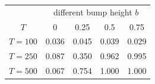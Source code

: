 % 
\begin{tabular}{ccccc}
  \hline
  & \multicolumn{4}{c}{different bump height $b$} \\
 $T$ & 0 & 0.25 & 0.5 & 0.75 \\
 \hline
$T = 100$ & 0.036 & 0.045 & 0.039 & 0.029 \\ 
  $T = 250$ & 0.087 & 0.350 & 0.962 & 0.995 \\ 
  $T = 500$ & 0.067 & 0.754 & 1.000 & 1.000 \\ 
   \hline
\end{tabular}
